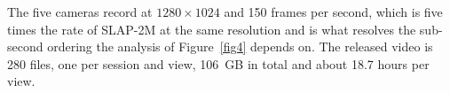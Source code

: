 %
%
%
%

The five cameras record at $1280 \times 1024$ and 150 frames per second, which is
five times the rate of SLAP-2M at the same resolution and is what resolves the
sub-second ordering the analysis of Figure~\ref{fig4} depends on. The released
video is 280 files, one per session and view, 106~GB in total and about 18.7
hours per view.

